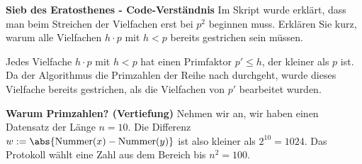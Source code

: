 \begin{questions}
\begin{solution}
\end{solution}
\droptotalpoints

\question \textbf{Sieb des Eratosthenes - Code-Verständnis}
Im Skript wurde erklärt, dass man beim Streichen der Vielfachen erst bei $p^2$ beginnen muss.
Erklären Sie kurz, warum alle Vielfachen $h \cdot p$ mit $h < p$ bereits gestrichen sein müssen.
\begin{solution}
	Jedes Vielfache $h \cdot p$ mit $h < p$ hat einen Primfaktor $p' \leq h$, der kleiner als $p$ ist. Da der Algorithmus die Primzahlen der Reihe nach durchgeht, wurde dieses Vielfache bereits gestrichen, als die Vielfachen von $p'$ bearbeitet wurden.
\end{solution}
\droptotalpoints

\question \textbf{Warum Primzahlen? (Vertiefung)}
Nehmen wir an, wir haben einen Datensatz der Länge $n=10$. Die Differenz $w := \abs{\text{Nummer}(x) - \text{Nummer}(y)}$ ist also kleiner als $2^{10} = \num{1024}$.
Das Protokoll wählt eine Zahl aus dem Bereich bis $n^2 = 100$.
\begin{solution}
	\begin{parts}

\end{parts}
\end{solution}
\end{questions}
